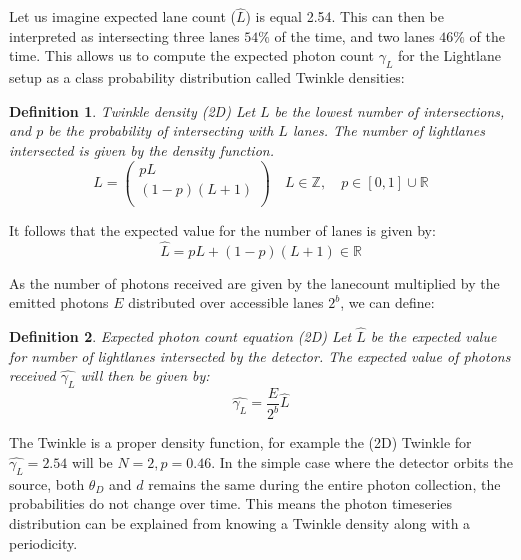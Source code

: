 \documentclass[notitlepage]{article}
\newtheorem{definition}{Definition}[section]
\begin{document}
Let us imagine expected lane count ($ \hat{L} $) is equal 2.54. This can then be interpreted as intersecting three lanes $54\%$ of the time, and two lanes $46\%$ of the time. This allows us to compute the expected photon count $\hat{\gamma_L}$ for the Lightlane setup as a class probability distribution called Twinkle densities:

\begin{definition}{\large Twinkle density (2D)} 
Let $L$ be the lowest number of intersections, and $p$ be the probability of intersecting with $L$ lanes. The number of lightlanes intersected is given by the density function. 
\begin{equation}
\label{eq:TwinkleDensity2D1}
L =
\begin{pmatrix}
pL \\
(1-p)(L+1)\\
\end{pmatrix}
\quad	L \in \mathbb{Z}, \quad p \in [0, 1] \cup  \mathbb{R}
\end{equation}
\end{definition}

It follows that the expected value for the number of lanes is given by:
\begin{equation}
\label{eq:TwinkleDensity2D2}
\hat{L} 
=
pL + (1-p)(L+1)
\in \mathbb{R}
\end{equation}


As the number of photons received are given by the lanecount multiplied by the emitted photons $E$ distributed over accessible lanes $2^b$, we can define:

\begin{definition}{\large Expected photon count  equation (2D)} 
Let $\hat{L}$ be the expected value for number of lightlanes intersected by the detector. The expected value of photons received $\hat{\gamma_L}$ will then be given by:
\begin{equation}
\label{eq:gammaL}
\hat{\gamma_L} =
\frac{E}{2^b}
\hat{L}
\end{equation}
\end{definition}

 The Twinkle is a proper density function, for example the (2D) Twinkle for $\hat{\gamma_{L}} = 2.54$ will be $N = 2, p = 0.46$. In the simple case where the detector orbits the source, both $ \theta_D $ and $d$ remains the same during the entire photon collection, the probabilities do not change over time. This means the photon timeseries distribution can be explained from knowing a Twinkle density along with a periodicity. 
 
\end{document}
